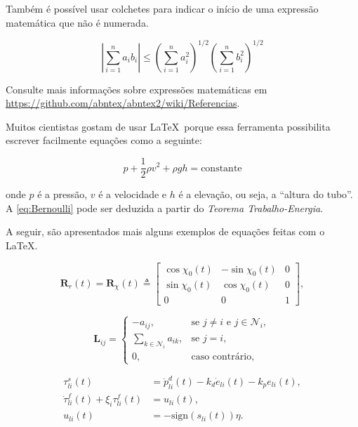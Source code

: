 Também é possível usar colchetes para indicar o início de uma expressão matemática que não é numerada.

\[
\left|\sum_{i=1}^n a_ib_i\right|
\le
\left(\sum_{i=1}^n a_i^2\right)^{1/2}
\left(\sum_{i=1}^n b_i^2\right)^{1/2}
\]

Consulte mais informações sobre expressões matemáticas em \url{https://github.com/abntex/abntex2/wiki/Referencias}.

Muitos cientistas gostam de usar \LaTeX\ porque essa ferramenta possibilita escrever facilmente equações como a seguinte:

\begin{equation}
p+\frac{1}{2}{\rho}v^2+{\rho}gh = \text{constante}
 \label{eq:Bernoulli}
\end{equation}

\noindent onde $p$ é a pressão, $v$ é a velocidade e $h$ é a elevação, ou seja, a ``altura do tubo''. A \autoref{eq:Bernoulli} pode ser deduzida a partir do \textit{Teorema Trabalho-Energia}.


A seguir, são apresentados mais alguns exemplos de equações feitas com o \LaTeX.

\newcommand{\vt}[1]{\mathbf{#1}}

\begin{equation}\label{eq:R_f_usual}
\vt{R}_r(t) = \vt{R}_{\chi}(t) \triangleq 
\begin{bmatrix}
\cos \chi_0 (t) & -\sin \chi_0 (t) & 0
\\
\sin \chi_0 (t) & \cos \chi_0 (t) & 0
\\
0 & 0 & 1
\end{bmatrix},
\end{equation}

\begin{equation}
\vt{L}_{ij} = 
\begin{cases}
-a_{ij}, & \text{se } j \neq i \text{ e } j \in \mathcal{N}_i, \\
\sum_{k \in \mathcal{N}_i} a_{ik}, & \text{se } j = i,  \\
0, & \text{caso contrário},
\end{cases}
\end{equation}

\begin{align}
\tau_{li}^s(t) &= \ddot{p}^d_{li}(t) - k_{d} \dot{e}_{li}(t) - k_{p} e_{li}(t),
\\
\dot{\tau}_{li}^f(t) +  \xi_{i} \tau_{li}^f(t) &= u_{li}(t),\label{eq:filtro_i}
\\
u_{li}(t) &= - \textrm{sign}(s_{li}(t))\eta. \label{eq:u_xbi}
\end{align}

